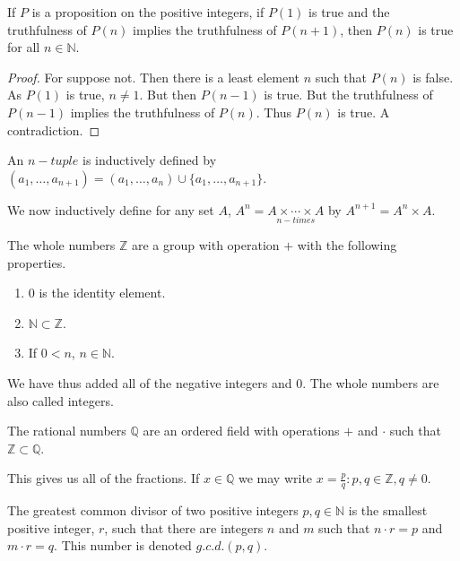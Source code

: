 \documentclass[crop=false,class=book]{standalone}
\begin{document}
\begin{theorem}
If $P$ is a proposition on the positive integers, if $P(1)$ is true and the truthfulness of $P(n)$ implies the truthfulness of $P(n+1)$, then $P(n)$ is true for all $n\in \mathbb{N}$.
\end{theorem}
\begin{proof}
For suppose not. Then there is a least element $n$ such that $P(n)$ is false. As $P(1)$ is true, $n\ne 1$. But then $P(n-1)$ is true. But the truthfulness of $P(n-1)$ implies the truthfulness of $P(n)$. Thus $P(n)$ is true. A contradiction.
\end{proof}
\begin{definition}
An $n-tuple$ is inductively defined by $(a_1,\hdots,a_{n+1}) = (a_1,\hdots, a_n)\cup \{a_1,\hdots,a_{n+1}\}$.
\end{definition}
\begin{definition}
We now inductively define for any set $A$, $A^{n} = \underset{n-times}{A\times \cdots \times A}$ by $A^{n+1} = A^n \times A$.
\end{definition}
\begin{definition}
The whole numbers $\mathbb{Z}$ are a group with operation $+$ with the following properties.
\begin{enumerate}
\item $0$ is the identity element.
\item $\mathbb{N}\subset \mathbb{Z}$.
\item If $0<n$, $n\in \mathbb{N}$.
\end{enumerate}
\end{definition}
\begin{remark}
We have thus added all of the negative integers and $0$. The whole numbers are also called integers.
\end{remark}
\begin{definition}
The rational numbers $\mathbb{Q}$ are an ordered field with operations $+$ and $\cdot$ such that $\mathbb{Z}\subset \mathbb{Q}$.
\end{definition}
\begin{remark}
This gives us all of the fractions. If $x\in \mathbb{Q}$ we may write $x= \frac{p}{q}:p,q\in \mathbb{Z}, q\ne 0$.
\end{remark}
\begin{definition}
The greatest common divisor of two positive integers $p,q\in \mathbb{N}$ is the smallest positive integer, $r$, such that there are integers $n$ and $m$ such that $n\cdot r = p$ and $m\cdot r = q$. This number is denoted $g.c.d.(p,q)$.
\end{definition}
\end{document}
